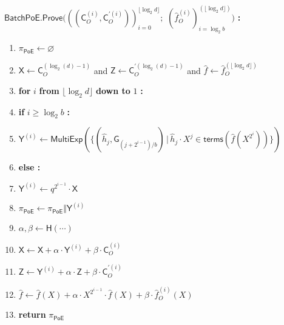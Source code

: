 \documentclass{article}
\theoremstyle{Definition}
\begin{document}
\begin{mdframed}
$\mathsf{BatchPoE.Prove}(((\mathsf{C}_O^{(i)}, \mathsf{C}_O^{\prime(i)}))_{i=0}^{\lfloor \log_2 d\rfloor};$ $(\hat{f}_O^{(i)})_{i = \log_2 b}^{(\lfloor \log_2 d\rfloor)})$ \textbf{:}
\begin{enumerate}[nolistsep]
	\item $\pi_{\mathsf{PoE}} \gets \varnothing$
	\item $\mathsf{X} \gets \mathsf{C}_O^{(\log_2(d)-1)}$ and $\mathsf{Z} \gets \mathsf{C}_O^{\prime(\log_2(d)-1)}$ and $\hat{f} \gets \hat{f}_O^{(\lfloor \log_2 d \rfloor)}$
	\item \textbf{for} $i$ \textbf{from} $\lfloor \log_2 d \rfloor$ \textbf{down to} $1$ \textbf{:}
	\item \pcind \textbf{if} $i \geq \log_2 b$ \textbf{:} 
	\item \pcind \pcind $\mathsf{Y}^{(i)} \gets \mathsf{MultiExp}(\{(\hat{h}_j, \mathsf{G}_{(j+2^{i-1})/b}) \, | \, \hat{h}_j \cdot X^j \in \mathsf{terms}(\hat{f}(X^{2^i})) \})$ \label{line:batchpoeprove-big}
	\item \pcind \textbf{else :}
	\item \pcind \pcind $\mathsf{Y}^{(i)} \gets q^{2^{i-1}} \cdot \mathsf{X}$ \label{line:batchpoeprove-small}
	\item \pcind $\pi_{\mathsf{PoE}} \gets \pi_{\mathsf{PoE}} \Vert \mathsf{Y}^{(i)}$
	\item \pcind $\alpha, \beta \gets \mathsf{H}(\cdots)$ 
	\item \pcind $\mathsf{X} \gets \mathsf{X} + \alpha \cdot \mathsf{Y}^{(i)} + \beta \cdot \mathsf{C}_O^{(i)}$ \label{line:batchpoeprove-regular}
	\item \pcind $\mathsf{Z} \gets \mathsf{Y}^{(i)} + \alpha \cdot \mathsf{Z} + \beta \cdot \mathsf{C}_O^{\prime(i)}$\label{line:batchpoeprove-prime}
	\item \pcind $\hat{f} \gets \hat{f}(X) + \alpha \cdot X^{2^{i-1}} \cdot \hat{f}(X) + \beta \cdot \hat{f}^{(i)}_O(X)$
	\item \textbf{return} $\pi_{\mathsf{PoE}}$
\end{enumerate}

\end{mdframed}
\end{document}
